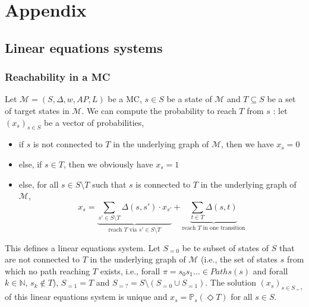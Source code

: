 \chapter*{Appendix}

\section{Linear equations systems}
\subsection{Reachability in a MC}
Let $\mathcal{M} = (S, \Delta, w, AP, L)$ be a MC, $s \in S$ be a state of $\mathcal{M}$ and $T \subseteq S$ be a set of target states in $\mathcal{M}$.
We can compute the probability to reach $T$ from $s$ :
let $(x_s)_{s \in S}$ be a vector of probabilities,
\begin{itemize}
	\item if $s$ is not connected to $T$ in the underlying graph of $\mathcal{M}$, then we have $x_s = 0$
	\item else, if $s \in T$, then we obviously have $x_s = 1$
	\item else, for all $s \in S \setminus T$  such that $s$ is connected to $T$ in the underlying graph of $\mathcal{M}$,
		\[
      x_s = \underbrace{\sum_{s' \in S \setminus T} \Delta(s, s') \cdot x_{s'}}_{\text{reach $T$ via $s' \in S \setminus T$}} + \underbrace{\sum_{t \in T} \Delta(s, t)}_{\text{reach $T$ in one transition}}
    \]
\end{itemize}
This defines a linear equations system.
Let $S_{=0}$ be te subset of states of $S$ that are not connected to $T$ in the underlying graph of $\mathcal{M}$ (i.e., the set of states $s$ from which no path reaching $T$ exists, i.e., forall $\pi = s_0s_1\dots \in Paths(s)$ and forall $k \in \mathbb{N}$, $s_k \not\in T$), $S_{=1} = T$ and $S_{=?} = S \setminus (S_{=0} \cup S_{=1})$.
The solution $(x_s)_{s \in S_{=?}}$ of this linear equations system is unique and $x_s = \mathbb{P}_s(\Diamond T)$ for all $s \in S$.

